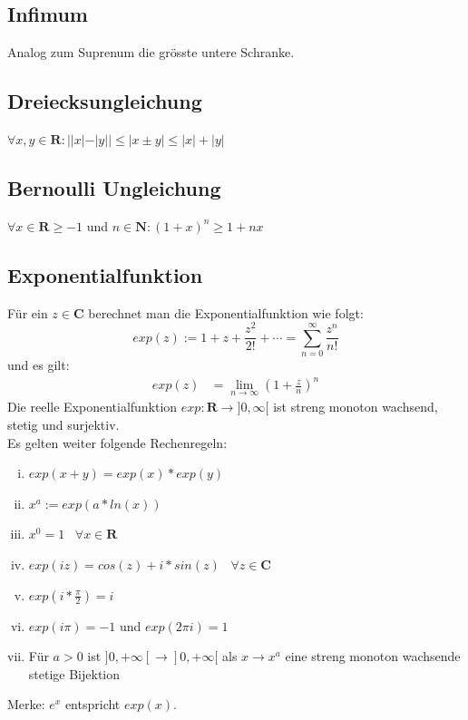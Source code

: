 \documentclass[8pt]{article}
\begin{document}
\begin{multicols*}{3}
\subsection{Infimum}

Analog zum Suprenum die grösste untere Schranke.

\subsection{Dreiecksungleichung}

\begin{center}
  $\forall x, y \in \mathbf{R} : ||x| - |y|| \leq |x \pm y| \leq |x| + |y|$
\end{center}

\subsection{Bernoulli Ungleichung}

\begin{center}
  $ \forall x \in \mathbf{R} \geq -1$ und $n \in \mathbf{N}: (1 + x)^{n} \geq 1 + nx$
\end{center}

\subsection{Exponentialfunktion}

Für ein $z \in \mathbf{C}$ berechnet man die Exponentialfunktion wie folgt:
$$
  exp(z) := 1 + z + \frac{z^2}{2!} + \cdots = \sum_{n = 0}^\infty \frac{z^n}{n!}
$$
und es gilt:
\begin{align*}
  exp(z) &= \lim_{n \rightarrow \infty} (1 + \frac{z}{n})^n
\end{align*}
Die reelle Exponentialfunktion $exp: \mathbf{R} \rightarrow ]0, \infty[$ ist streng monoton wachsend,
stetig und surjektiv.\\
Es gelten weiter folgende Rechenregeln:
\begin{enumerate}[(i)]
  \item $exp(x + y) = exp(x) * exp(y)$
  \item $x^a := exp(a * ln(x))$
  \item $x^0 = 1 \;\;\; \forall x \in \mathbf{R}$
  \item $exp(iz) = cos(z) + i*sin(z) \;\;\; \forall z \in \mathbf{C}$
  \item $exp(i*\frac{\pi}{2}) = i$
  \item $exp(i\pi) = -1$ und $exp(2\pi i) = 1$
  \item Für $a > 0$ ist $]0, +\infty[ \rightarrow ]0, +\infty[$ als $x \rightarrow x^a$ eine
  streng monoton wachsende stetige Bijektion
\end{enumerate}
Merke: $e^x$ entspricht $exp(x)$.


\end{multicols*}
\end{document}
